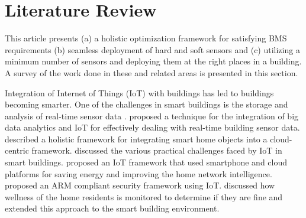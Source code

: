 \documentclass[]{interact}
\theoremstyle{plain}%
\theoremstyle{definition}
\theoremstyle{remark}
\begin{document}
\section{Literature Review}

This article  presents (a) a holistic optimization framework for satisfying BMS requirements (b) seamless deployment of hard  and soft sensors and  
(c) utilizing a minimum number of sensors and deploying them at the right places in a building. A survey of the work done in these and related areas is presented in this section. 

Integration of Internet of Things (IoT) with buildings has led to buildings becoming smarter. 
One of the challenges in smart buildings is the storage and analysis of real-time sensor data \citep{zanella, building_smart}.  
\cite{iot_sb_bigdata} proposed a technique for the integration of big data analytics and IoT for effectively dealing with real-time building sensor data. 
\cite{iot_sb_challenges}  described a holistic framework for integrating smart home objects into a cloud-centric framework.
\cite{iot_sb_ems_opti}  discussed the various practical challenges faced by IoT in smart buildings.
\cite{iot_sb_prototype} proposed an IoT framework that used smartphone and cloud platforms for saving energy and improving the home network intelligence.
\cite{iot_sb_safir} proposed an ARM compliant security framework using IoT.
\cite{iot_sb_wsn} discussed how wellness of the home residents is monitored to determine if they are fine and extended this approach to the smart building environment. 

\end{document}
